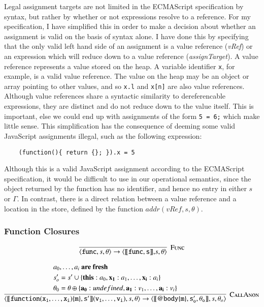 \documentclass[12pt,a4paper,twoside,openright]{report}
\newcommand*{\js}{\texttt}
\begin{document}
Legal assignment targets are not limited in the ECMAScript specification by
syntax, but rather by whether or not expressions resolve to a reference. For my
specification, I have simplified this in order to make a decision about whether
an assignment is valid on the basis of syntax alone. I have done this by
specifying that the only valid left hand side of an assignment is a value
reference (\textit{vRef}) or an expression which will reduce down to a value
reference (\textit{assignTarget}). A value reference represents a value stored
on the heap. A variable identifier \js{x}, for example, is a valid value
reference. The value on the heap may be an object or array pointing to other
values, and so \js{x.l} and \js{x[n]} are also value references. Although value
references share a syntactic similarity to dereferencable expressions, they are
distinct and do not reduce down to the value itself. This is important, else we
could end up with assignments of the form \js{5 = 6;} which make little sense.
This simplification has the consequence of deeming some valid JavaScript
assignments illegal, such as the following expression:
\begin{program}[H]
 \begin{verbatim}
	(function(){ return {}; }).x = 5
 \end{verbatim}
\end{program}
Although this is a valid JavaScript assignment according to the ECMAScript
specification, it would be difficult to use in our operational semantics, since
the object returned by the function has no identifier, and hence no entry in
either $s$ or $\Gamma$. In contrast, there is a direct relation between a value
reference and a location in the store, defined by the function 
$addr(vRef, s, \theta)$.

\subsubsection*{Function Closures}

$$\infer[\textsc{Func}]
{\langle \mathtt{func}, s, \theta\rangle \rightarrow
\langle\mathtt{[\![func, s]\!],} s, \theta\rangle}{}$$

$$\infer[\textsc{CallAnon}]
{\langle\mathtt{[\![function(x_1, \dots, x_i)\{m\},s']\!](v_1, \dots, v_i)}, s, \theta\rangle\rightarrow
	\langle\mathtt{[\![@body\{m\},s_o',\theta_o]\!]},s, \theta_o\rangle
}{
	\begin{split}
		&a_0, \dots, a_i\textbf{ are fresh} \\
		&s_o' = s' \cup \{\mathbf{this}: a_0, \mathbf{x_1}:a_1, \dots, \mathbf{x_i}: a_i\} \\
		&\theta_0 = \theta \oplus\{\mathbf{a_0}: undefined, \mathbf{a_1}:v_1, \dots, \mathbf{a_i}: v_i\}
	\end{split}
}$$
\end{document}
